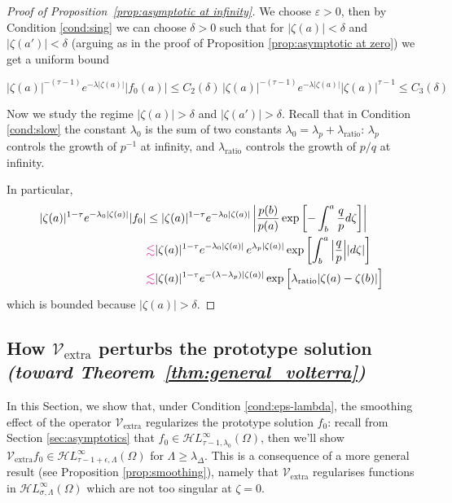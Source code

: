 \documentclass{article}
\theoremstyle{plain}
\newcommand{\singexp}[2]{\mathcal{H}L^\infty_{#1, #2}}
\newcommand{\softpart}{\mathcal{V}_\text{extra}}
\begin{document}
\begin{proof}[Proof of Proposition~\ref{prop:asymptotic at infinity}]
We choose $\varepsilon>0$, then by Condition \eqref{cond:sing} we can choose $\delta>0$ such that for $|\zeta(a)|<\delta$ and $|\zeta(a')|<\delta$ (arguing as in the proof of Proposition \ref{prop:asymptotic at zero}) we get a uniform bound 

\[   |\zeta(a)|^{-(\tau-1)} e^{-\lambda |\zeta(a)|} |f_0(a)|\leq  C_2(\delta)\, |\zeta(a)|^{-(\tau-1)} e^{-\lambda |\zeta(a)|} |\zeta(a)|^{\tau-1} \leq C_3(\delta)
\]

Now we study the regime $|\zeta(a)|>\delta$ and $|\zeta(a')|>\delta$. Recall that in Condition \eqref{cond:slow} the constant $\lambda_0$ is the sum of two constants $\lambda_0=\lambda_p+\lambda_\text{ratio}$: $\lambda_p$ controls the growth of $p^{-1}$ at infinity, and $\lambda_\text{ratio}$ controls the growth of $p/q$ at infinity. 

In particular, 
      \begin{align*}
          |\zeta(a)|^{1-\tau} e^{-\lambda_0 |\zeta(a)|} |f_0|&\leq  |\zeta(a)|^{1-\tau} e^{-\lambda_0 |\zeta(a)|} \left\vert\frac{p(b)}{p(a)}\exp\left[-\int_{b}^{a}\frac{q}{p} d\zeta\right]\right\vert \\
          & \textcolor{magenta}{\lesssim}  |\zeta(a)|^{1-\tau} e^{-\lambda_0 |\zeta(a)|}  \, e^{\lambda_p|\zeta(a)|}\exp\left[\int_{b}^{a} \Big\vert\frac{q}{p} \Big\vert |d\zeta| \right]\\
          & \textcolor{magenta}{\lesssim}  |\zeta(a)|^{1-\tau} e^{-(\lambda-\lambda_p) |\zeta(a)|} \exp\Big[\lambda_\text{ratio} |\zeta(a)-\zeta(b)| \Big]
      \end{align*}
   which is bounded because $|\zeta(a)|>\delta$. 


\end{proof}

\subsection{How $\softpart$ perturbs the prototype solution \\ \textit{(toward Theorem~\ref{thm:general_volterra})}}\label{sec:image under soft_part}

In this Section, we show that, under Condition \eqref{cond:eps-lambda}, the smoothing effect of the operator $\softpart$ regularizes the prototype solution $f_0$: recall from Section \ref{sec:asymptotics} that $f_0\in\singexp{\tau-1}{\lambda_0}(\Omega)$, then we'll show $\softpart f_0 \in\singexp{\tau-1+\epsilon}{\Lambda}(\Omega)$ for $\Lambda\geq \lambda_\Delta$. This is a consequence of a more general result (see Proposition \ref{prop:smoothing}), namely that $\softpart$ regularises functions in $\singexp{\sigma}{\Lambda}(\Omega)$ which are not too singular at $\zeta=0$.  
\end{document}

